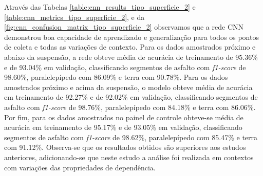 Através das Tabelas \ref{table:cnn_results_tipo_superficie_2} e \ref{table:cnn_metrics_tipo_superficie_2}, e da \autoref{fig:cnn_confusion_matrix_tipo_superficie_2} observamos que a rede CNN demonstrou boa capacidade de aprendizado e generalização para todos os pontos de coleta e todas as variações de contexto. Para os dados amostrados próximo e abaixo da suspensão, a rede obteve média de acurácia de treinamento de 95.36\% e de 93.04\% em validação, classificando segmentos de asfalto com \textit{f1-score} de 98.60\%, paralelepípedo com 86.09\% e terra com 90.78\%. Para os dados amostrados próximo e acima da suspensão, o modelo obteve média de acurácia em treinamento de 92.27\% e de 92.02\% em validação, classificando segmentos de asfalto com \textit{f1-score} de 98.76\%, paralelepípedo com 84.18\% e terra com 86.06\%. Por fim, para os dados amostrados no painel de controle obteve-se média de acurácia em treinamento de 95.17\% e de 93.05\% em validação, classificando segmentos de asfalto com \textit{f1-score} de 98.62\%, paralelepípedo com 85.47\% e terra com 91.12\%. Observa-se que os resultados obtidos são superiores aos estudos anteriores, adicionando-se que neste estudo a análise foi realizada em contextos com variações das propriedades de dependência.